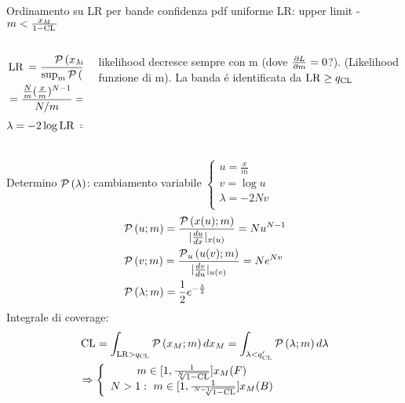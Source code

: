 \begin{wordonframe}{Ordinamento su LR per bande confidenza pdf uniforme}
LR: upper limit - $m<\frac{x_M}{1-\cl{}}$
\begin{columns}[T]
\begin{column}{0.5\textwidth}
\begin{align*}
&\lr{}=\frac{\prob{(x_M;m)}}{\sup_m{\prob{(x_M;m)}}}\\
&=\frac{\frac{N}{m}(\frac{x}{m})^{N-1}}{N/m}=(\frac{x}{m})^N\\
&\lambda=-2\log{\lr{}}=-2N\log{\frac{x}{m}}
\end{align*}
\end{column}
\begin{column}{0.5\textwidth}
likelihood decresce sempre con m (dove $\PDy{m}{L}=0$?).  (Likelihood funzione di m).
La banda \'e identificata da $\lr\geq q_{\cl{}}$
\end{column}
\end{columns}
Determino $\prob{(\lambda)}$: cambiamento variabile $\left\{\begin{array}{c}
u=\frac{x}{m}\\
v=\log{u}\\
\lambda=-2Nv\\
\end{array}\right.$
\begin{align*}
&\prob{(u;m)}=\frac{\prob{(x(u);m)}}{|\TDy{x}{u}|_{x(u)}}=Nu^{N-1}\\
&\prob{(v;m)}=\frac{\prob_u{(u(v);m)}}{|\TDy{u}{v}|_{u(v)}}=N\exp{Nv}\\
&\prob{(\lambda;m)}=\frac{1}{2}\exp{-\frac{\lambda}{2}}
\end{align*}
Integrale di coverage:
\begin{align*}
&\cl=\int_{\lr>q_{\cl}}\prob{(x_M;m)}\,dx_M=\int_{\lambda<q_{\cl}'}\prob{(\lambda;m)}\,d\lambda\\
&\Rightarrow \left\{\begin{array}{c}
m\in[1,\frac{1}{\sqrt[N]{1-\cl}}]x_M (F)\\
N>1:\ m\in[1,\frac{1}{\sqrt[N-1]{1-\cl}}]x_M (B)\\
\end{array}
\right.
\end{align*}
\end{wordonframe}


